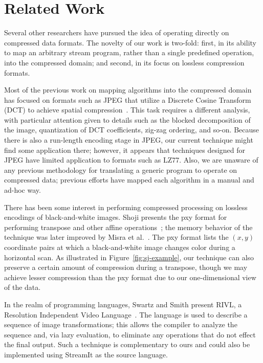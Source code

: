 \section{Related Work}
\label{sec:related}

Several other researchers have pursued the idea of operating directly
on compressed data formats.  The novelty of our work is two-fold:
first, in its ability to map an arbitrary stream program, rather than
a single predefined operation, into the compressed domain; and second,
in its focus on lossless compression formats.

Most of the previous work on mapping algorithms into the compressed
domain has focused on formats such as JPEG that utilize a Discrete
Cosine Transform (DCT) to achieve spatial
compression~\cite{smith98,dorai00,dugad01,feng03,mukherjee02,nang00,shen96,shen96b,shen98,smith96b,vasudev98}.
This task requires a different analysis, with particular attention
given to details such as the blocked decomposition of the image,
quantization of DCT coefficients, zig-zag ordering, and so-on.
Because there is also a run-length encoding stage in JPEG, our current
technique might find some application there; however, it appears that
techniques designed for JPEG have limited application to formats such
as LZ77.  Also, we are unaware of any previous methodology for
translating a generic program to operate on compressed data; previous
efforts have mapped each algorithm in a manual and ad-hoc way.

There has been some interest in performing compressed processing on
lossless encodings of black-and-white images.  Shoji presents the pxy
format for performing transpose and other affine
operations~\cite{shoji95}; the memory behavior of the technique was
later improved by Misra et al.~\cite{misra99}.  
The pxy format lists the $(x,y)$ coordinate pairs at which a
black-and-white image changes color during a horizontal scan.  As
illustrated in Figure~\ref{fig:sj-example}, our technique can also
preserve a certain amount of compression during a transpose, though we
may achieve lesser compression than the pxy format due to our
one-dimensional view of the data.

In the realm of programming languages, Swartz and Smith present RIVL,
a Resolution Independent Video Language~\cite{swartz95}.  The language
is used to describe a sequence of image transformations; this allows
the compiler to analyze the sequence and, via lazy evaluation, to
eliminate any operations that do not effect the final output.  Such a
technique is complementary to ours and could also be implemented using
StreamIt as the source language.
